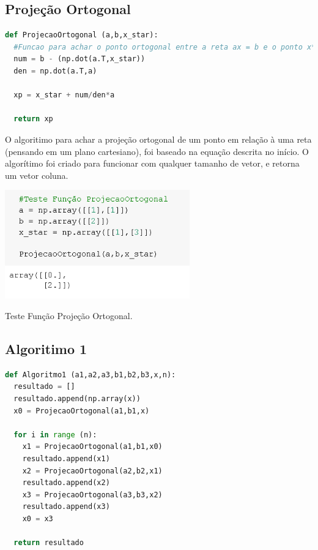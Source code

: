 \documentclass[a4paper, 12pt]{article}
\begin{document}
\subsection{Projeção Ortogonal}

\begin{lstlisting}[language=Python, caption=Projeção Ortogonal, label=listing_ProjecaoOrtogonal] 
def ProjecaoOrtogonal (a,b,x_star):
  #Funcao para achar o ponto ortogonal entre a reta ax = b e o ponto x*
  num = b - (np.dot(a.T,x_star))
  den = np.dot(a.T,a)

  xp = x_star + num/den*a

  return xp
\end{lstlisting}

O algoritimo para achar a projeção ortogonal de um ponto em relação à uma reta (pensando em um plano cartesiano), foi baseado na equação descrita no início. O algorítimo foi criado para funcionar com qualquer tamanho de vetor, e retorna um vetor coluna.

\begin{center}
    \includegraphics[width=8cm]{08_Teste_Projecao_Ortogonal.PNG}
    
    Teste Função Projeção Ortogonal.
\end{center}

\subsection{Algoritimo 1}

\begin{lstlisting}[language=Python, caption=Algoritimo1, label=listing_Algoritimo1] 
def Algoritmo1 (a1,a2,a3,b1,b2,b3,x,n):
  resultado = []
  resultado.append(np.array(x))
  x0 = ProjecaoOrtogonal(a1,b1,x)

  for i in range (n):
    x1 = ProjecaoOrtogonal(a1,b1,x0)
    resultado.append(x1)
    x2 = ProjecaoOrtogonal(a2,b2,x1)
    resultado.append(x2)
    x3 = ProjecaoOrtogonal(a3,b3,x2)
    resultado.append(x3)
    x0 = x3
  
  return resultado
\end{lstlisting}
\end{document}
